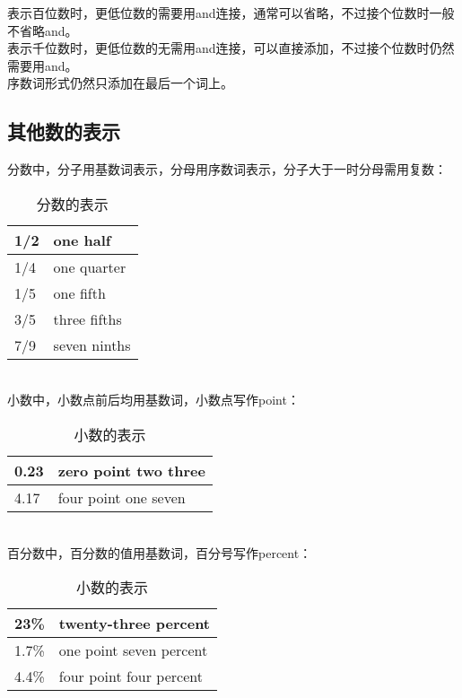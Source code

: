 \documentclass[UTF8]{ctexart}
\newcommand{\littf}[1]{{\hspace{3pt}\ttfamily #1}}
\begin{document}
    表示百位数时，更低位数的需要用\littf{and}连接，通常可以省略，不过接个位数时一般不省略\littf{and}。\\[3mm]
    表示千位数时，更低位数的无需用\littf{and}连接，可以直接添加，不过接个位数时仍然需要用\littf{and}。\\[3mm]
    序数词形式仍然只添加在最后一个词上。
    
\newpage

\subsection{其他数的表示}
    分数中，分子用基数词表示，分母用序数词表示，分子大于一时分母需用复数：
    \begin{table}[h!]
        \begin{center}
            \ttfamily
            \begin{tabular}{p{80pt}|p{140pt}}
                \hline
                1/2&one half\\ \hline
                1/4&one quarter\\ \hline
                1/5&one fifth\\ \hline
                3/5&three fifths\\ \hline
                7/9&seven ninths\\ \hline
            \end{tabular}
            \rmfamily
            \caption{分数的表示}
        \end{center}
    \end{table}\\
    小数中，小数点前后均用基数词，小数点写作\littf{point}：
    \begin{table}[h!]
        \begin{center}
            \ttfamily
            \begin{tabular}{p{80pt}|p{140pt}}
                \hline
                0.23&zero point two three\\ \hline
                4.17&four point one seven\\ \hline
            \end{tabular}
            \rmfamily
            \caption{小数的表示}
        \end{center}
    \end{table}\\
    百分数中，百分数的值用基数词，百分号写作\littf{percent}：
    \begin{table}[h!]
        \begin{center}
            \ttfamily
            \begin{tabular}{p{80pt}|p{140pt}}
                \hline
                23\%&twenty-three percent\\ \hline
                1.7\%&one point seven percent\\ \hline
                4.4\%&four point four percent\\ \hline
            \end{tabular}
            \rmfamily
            \caption{小数的表示}
        \end{center}
    \end{table}\vspace{-25pt}
    
\end{document}
